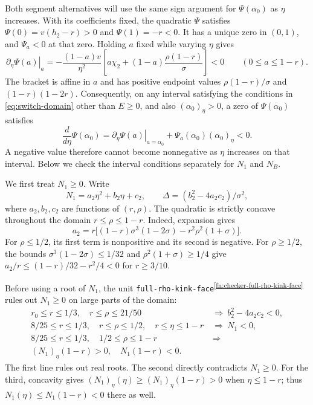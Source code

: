 \documentclass[11pt]{article}
\theoremstyle{remark}
\theoremstyle{plain}
\begin{document}
Both segment alternatives will use the same sign argument
for $\Psi(\alpha_0)$ as $\eta$ increases. With its coefficients
fixed, the quadratic $\Psi$ satisfies
$\Psi(0)=v(h_2-r)>0$ and $\Psi(1)=-r<0$.
It has a unique zero in $(0,1)$, and $\Psi_a<0$ at that zero.
Holding $a$ fixed while varying $\eta$ gives
\begin{equation}
 \left.\partial_\eta\Psi(a)\right|_a
 =-\frac{(1-a)v}{\eta^2}
   \left[a\chi_2+(1-a)\frac{\rho(1-r)}\sigma\right]<0
 \qquad(0\le a\le1-r).
 \label{eq:switch-fixed-argument-derivative}
\end{equation}
The bracket is affine in $a$ and has positive endpoint values
$\rho(1-r)/\sigma$ and $(1-r)(1-2r)$.
Consequently, on any interval satisfying the conditions in
\eqref{eq:switch-domain} other than $E\ge0$, and also
$(\alpha_0)_\eta>0$, a zero of $\Psi(\alpha_0)$ satisfies
\begin{equation}
 \frac{d}{d\eta}\Psi(\alpha_0)
 =\left.\partial_\eta\Psi(a)\right|_{a=\alpha_0}
      +\Psi_a(\alpha_0)(\alpha_0)_\eta<0.
 \label{eq:switch-zero-derivative}
\end{equation}
A negative value therefore cannot become nonnegative as $\eta$
increases on that interval. Below we check the interval conditions
separately for $N_1$ and $N_B$.

We first treat $N_1\ge0$. Write
\begin{equation}
 N_1=a_2\eta^2+b_2\eta+c_2,\qquad
 \Delta=(b_2^2-4a_2c_2)/\sigma^2,
 \label{eq:switch-discriminant}
\end{equation}
where $a_2,b_2,c_2$ are functions of $(r,\rho)$.
The quadratic is strictly concave throughout the domain
$r\le\rho\le1-r$.
Indeed, expansion gives
\[
 a_2=r\bigl[(1-r)\sigma^3(1-2\sigma)-r^2\rho^2(1+\sigma)\bigr].
\]
For $\rho\le1/2$, its first term is nonpositive and its second
is negative. For $\rho\ge1/2$, the bounds
$\sigma^3(1-2\sigma)\le1/32$ and $\rho^2(1+\sigma)\ge1/4$ give
$a_2/r\le(1-r)/32-r^2/4<0$ for $r\ge3/10$.

Before using a root of $N_1$, the unit \nolinkurl{full-rho-kink-face}\textsuperscript{\ref{fn:checker-full-rho-kink-face}}
rules out $N_1\ge0$ on large parts of the domain:
\begin{equation}
 \begin{aligned}
 r_0\le r\le1/3,\quad r\le\rho\le21/50
    &\ \Longrightarrow\ b_2^2-4a_2c_2<0,\\
 8/25\le r\le1/3,\quad r\le\rho\le1/2,\quad r\le\eta\le1-r
    &\ \Longrightarrow\ N_1<0,\\
 8/25\le r\le1/3,\quad 1/2\le\rho\le1-r
    &\ \Longrightarrow\\
       (N_1)_\eta(1-r)>0,\quad N_1(1-r)<0.
 \end{aligned}
 \label{eq:switch-preliminary-signs}
\end{equation}
The first line rules out real roots. The second directly contradicts
$N_1\ge0$. For the third, concavity gives
$(N_1)_\eta(\eta)\ge(N_1)_\eta(1-r)>0$ when $\eta\le1-r$;
thus $N_1(\eta)\le N_1(1-r)<0$ there as well.
\end{document}
